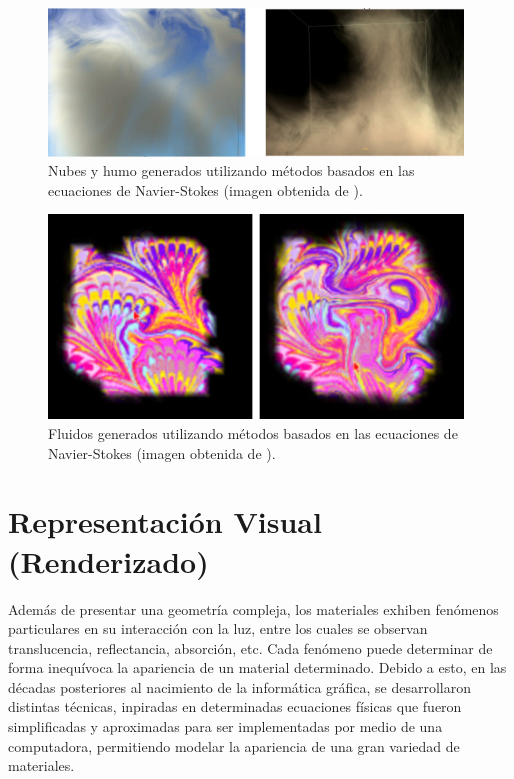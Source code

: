 \begin{figure}
\center
\includegraphics[width=11cm]{figures/fluidos1}
\caption[Nubes y humo generados utilizando métodos basados en las ecuaciones de Navier-Stokes.]{Nubes y humo generados utilizando métodos basados en las ecuaciones de Navier-Stokes (imagen obtenida de \cite{Stam1999}).}
\label{fg:fluidos1}
\end{figure}

\begin{figure}
\center
\includegraphics[width=11cm]{figures/fluidos2}
\caption[Fluidos generados utilizando métodos basados en las ecuaciones de Navier-Stokes.]{Fluidos generados utilizando métodos basados en las ecuaciones de Navier-Stokes (imagen obtenida de \cite{Stam1999}).}
\label{fg:fluidos2}
\end{figure}


\section{Representación Visual (Renderizado)}

Además de presentar una geometría compleja, los materiales exhiben fenómenos particulares en su interacción con la luz, entre los cuales se observan translucencia, reflectancia, absorción, etc.
Cada fenómeno puede determinar de forma inequívoca la apariencia de un material determinado.
Debido a esto, en las décadas posteriores al nacimiento de la informática gráfica, se desarrollaron distintas técnicas, inpiradas en determinadas ecuaciones físicas que fueron simplificadas y aproximadas para ser implementadas por medio de una computadora, permitiendo modelar la apariencia de una gran variedad de materiales.

